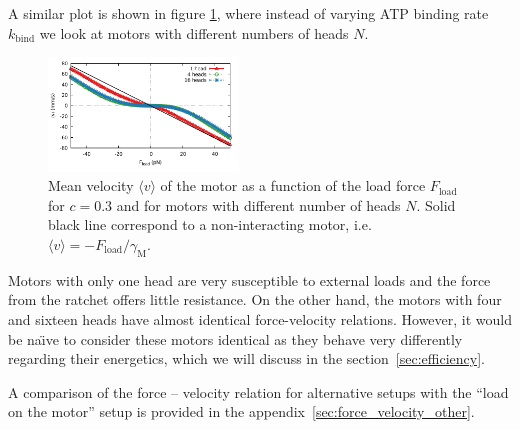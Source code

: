 \documentclass[aps,pre,twocolumn,showpacs,showkeys,superscriptaddress,floatfix]{revtex4-1}
\begin{document}
A similar plot is shown in figure \ref{fig:F_v_heads}, where instead of varying ATP binding rate $k_\text{bind}$ we look at motors with different numbers of heads $N$. 
\begin{figure}[t]
\centering
\includegraphics[width=0.45\textwidth,height=!]{F_v_heads}
\caption{
\label{fig:F_v_heads} 
Mean velocity $\langle v \rangle$ of the motor as a function of the load force $F_\text{load}$ for $c=0.3$ and for motors with different number of heads $N$.
Solid black line correspond to a non-interacting motor, i.e. $\langle v \rangle = - F_\text{load} / \gamma_\text{M}$. 
}
\end{figure}
Motors with only one head are very susceptible to external loads and the force from the ratchet offers little resistance. 
On the other hand, the motors with four and sixteen heads have almost identical force-velocity relations. 
However, it would be na\"{\i}ve to consider these motors identical as they behave very differently regarding their energetics,  
which we will discuss in the section~\ref{sec:efficiency}.

A comparison of the force -- velocity relation for alternative setups with the ``load on the motor'' setup is provided in the appendix~\ref{sec:force_velocity_other}.
\end{document}

